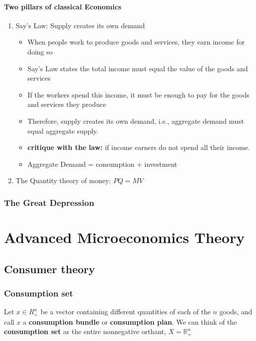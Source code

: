\documentclass[a4paper,13pt]{report}
\newcommand{\R}{\mathbb{R}}
\begin{document}
\subsubsection{Two pillars of classical Economics}
\begin{enumerate}
    \item Say's Law: Supply creates its own demand 
    \begin{itemize}
        \item When people work to produce goods and services, they earn income for doing so
        \item Say's Law states the total income must equal the value of the goods and services
        \item If the workers spend this income, it must be enough to pay for the goods and services they produce
        \item Therefore, supply creates its own demand, i.e., aggregate demand must equal aggregate supply.
        \item \textbf{critique with the law:} if income earners do not spend all their income. 
        \item Aggregate Demand = consumption + investment
    \end{itemize}
    \item The Quantity theory of money: $PQ=MV$
\end{enumerate}

\subsection{The Great Depression}

\chapter{Advanced Microeconomics Theory}
\section{Consumer theory}
\subsection{Consumption set}
Let $x\in R^n_+$ be a vector containing different quantities of each of the $n$ goods, and call $x$ a \textbf{consumption bundle} or \textbf{consumption plan}. We can think of the \textbf{consumption set} as the entire nonnegative orthant, $X=\R^n_+$
\end{document}

